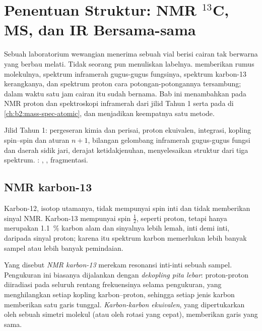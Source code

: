 \chapter{Penentuan Struktur: NMR \texorpdfstring{$^{13}$C}{13C}, MS, dan IR Bersama-sama}\label{ch:b2:structure-determination}

Sebuah laboratorium wewangian menerima sebuah vial berisi cairan tak
berwarna yang berbau melati. Tidak seorang pun menuliskan labelnya.  memberikan rumus molekulnya, spektrum inframerah gugus-gugus fungsinya,
spektrum karbon-13 kerangkanya, dan spektrum proton cara potongan-potongannya
tersambung; dalam waktu satu jam cairan itu sudah bernama. Bab ini
menambahkan  pada NMR proton dan spektroskopi inframerah dari
jilid Tahun 1 serta pada  di \cref{ch:b2:mass-spec-atomic},
dan menjadikan keempatnya satu metode.

\begin{recall}
Jilid Tahun 1: pergeseran kimia dan perisai, proton ekuivalen, integrasi,
kopling spin--spin dan aturan $n + 1$, bilangan gelombang inframerah
gugus-gugus fungsi dan daerah sidik jari, derajat ketidakjenuhan,
menyelesaikan struktur dari tiga spektrum. : , , fragmentasi.
\end{recall}

\section{NMR karbon-13}

Karbon-12, isotop utamanya, tidak mempunyai spin inti dan tidak memberikan
sinyal NMR. Karbon-13 mempunyai spin
$\tfrac12$, seperti proton, tetapi hanya merupakan 1.1~\% karbon alam dan
sinyalnya lebih lemah, inti demi inti, daripada sinyal proton; karena itu
spektrum karbon memerlukan lebih banyak sampel atau lebih banyak pemindaian.

\begin{definition}\label{def:b2:structure-determination:c13}
Yang disebut \emph{NMR karbon-13} merekam resonansi
inti-inti  sebuah sampel. Pengukuran ini biasanya dijalankan
dengan \emph{dekopling pita lebar}: proton-proton
diiradiasi pada seluruh rentang frekuensinya selama pengukuran, yang
menghilangkan setiap kopling karbon--proton, sehingga setiap jenis karbon
memberikan satu garis tunggal. \emph{Karbon-karbon
ekuivalen}, yang dipertukarkan oleh sebuah simetri
molekul (atau oleh rotasi yang cepat), memberikan garis yang sama.
\end{definition}


